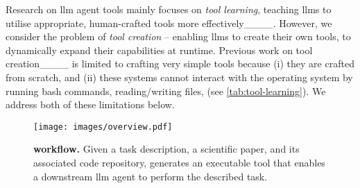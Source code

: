Research on \gls{llm} agent tools mainly focuses on \emph{tool learning}, \ie teaching \glspl{llm} to utilise appropriate, human-crafted tools more effectively____.
However, we consider the problem of \emph{tool creation} -- enabling \glspl{llm} to create their own tools, to dynamically expand their capabilities at runtime.
Previous work on tool creation____ is limited to crafting very simple tools because (i) they are crafted from scratch, and (ii) these systems cannot interact with the operating system by running bash commands, reading/writing files, \etc (see \cref{tab:tool-learning}). We address both of these limitations below.
\begin{table}[h]
  \caption{Comparison of tool creation methods. \emph{OS interaction} refers to the ability to interact with the operating system (\eg read/write files, run commands, web browsing). \emph{Complex tasks} require installing and using external dependencies (\eg libraries, model weights).}
  \label{tab:tool-learning}
\end{table}






\begin{figure*}[t]
  \texttt{[image: images/overview.pdf]}
  \caption{\textbf{\Ours workflow.}
    Given a task description, a scientific paper, and its associated code repository, \ours generates an executable tool that enables a downstream \gls{llm} agent to perform the described task.
  }
  \label{fig:overview}
\end{figure*}